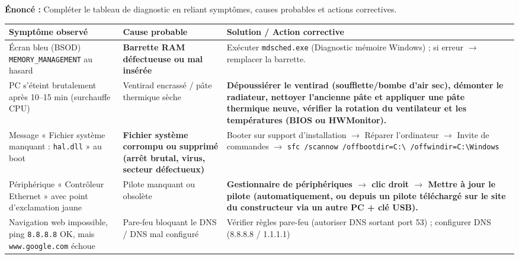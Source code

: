 \documentclass[11pt]{article}
\begin{document}
\begin{corrige}
\textbf{Énoncé :} Compléter le tableau de diagnostic en reliant symptômes, causes probables et actions correctives.
\tcblower
\begin{center}
\begin{tabularx}{\linewidth}{|X|X|X|}\hline
\rowcolor{popblueL}
\textbf{Symptôme observé} & \textbf{Cause probable} & \textbf{Solution / Action corrective} \\\hline
Écran bleu (BSOD) \texttt{MEMORY\_MANAGEMENT} au hasard & \textbf{Barrette RAM défectueuse ou mal insérée} & Exécuter \texttt{mdsched.exe} (Diagnostic mémoire Windows) ; si erreur $\rightarrow$ remplacer la barrette. \\\hline
PC s'éteint brutalement après 10--15 min (surchauffe CPU) & Ventirad encrassé / pâte thermique sèche & \textbf{Dépoussiérer le ventirad (soufflette/bombe d'air sec), démonter le radiateur, nettoyer l'ancienne pâte et appliquer une pâte thermique neuve, vérifier la rotation du ventilateur et les températures (BIOS ou HWMonitor).} \\\hline
Message « Fichier système manquant : \texttt{hal.dll} » au boot & \textbf{Fichier système corrompu ou supprimé (arrêt brutal, virus, secteur défectueux)} & Booter sur support d'installation $\rightarrow$ Réparer l'ordinateur $\rightarrow$ Invite de commandes $\rightarrow$ \texttt{sfc /scannow /offbootdir=C:\textbackslash\ /offwindir=C:\textbackslash Windows} \\\hline
Périphérique « Contrôleur Ethernet » avec point d'exclamation jaune & Pilote manquant ou obsolète & \textbf{Gestionnaire de périphériques $\rightarrow$ clic droit $\rightarrow$ Mettre à jour le pilote (automatiquement, ou depuis un pilote téléchargé sur le site du constructeur via un autre PC + clé USB).} \\\hline
Navigation web impossible, ping \texttt{8.8.8.8} OK, mais \texttt{www.google.com} échoue & Pare-feu bloquant le DNS / DNS mal configuré & Vérifier règles pare-feu (autoriser DNS sortant port 53) ; configurer DNS (8.8.8.8 / 1.1.1.1) \\\hline
\end{tabularx}
\end{center}


\end{corrige}
\end{document}
